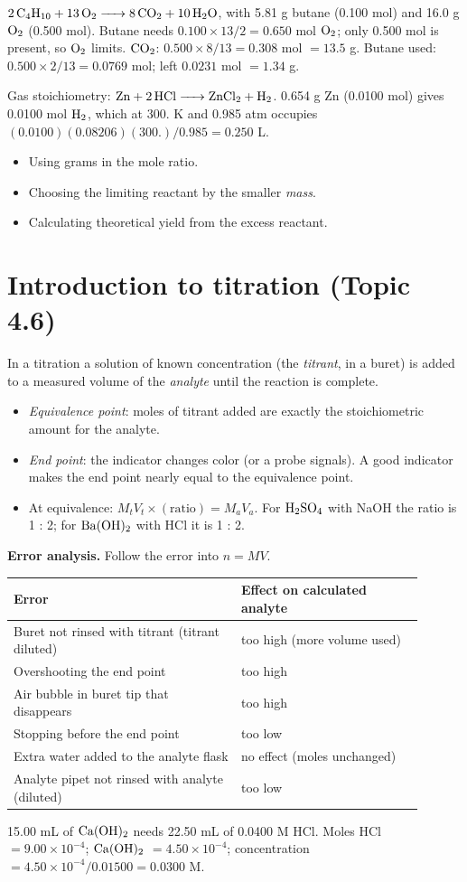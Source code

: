\documentclass[11pt]{article}
\begin{document}
 $\ce{2C4H10 + 13O2 -> 8CO2 + 10H2O}$, with 5.81 g butane (0.100 mol) and 16.0 g $\ce{O2}$ (0.500 mol). Butane needs $0.100 \times 13/2 = 0.650$ mol $\ce{O2}$; only 0.500 mol is present, so $\ce{O2}$ limits. $\ce{CO2}$: $0.500 \times 8/13 = 0.308$ mol $= 13.5$ g. Butane used: $0.500 \times 2/13 = 0.0769$ mol; left $0.0231$ mol $= 1.34$ g.

 Gas stoichiometry: $\ce{Zn + 2HCl -> ZnCl2 + H2}$. 0.654 g Zn (0.0100 mol) gives 0.0100 mol $\ce{H2}$, which at 300. K and 0.985 atm occupies $(0.0100)(0.08206)(300.)/0.985 = 0.250$ L.

\errorsh
\begin{itemize}
\item Using grams in the mole ratio.
\item Choosing the limiting reactant by the smaller \emph{mass}.
\item Calculating theoretical yield from the excess reactant.
\end{itemize}

\section{Introduction to titration (Topic 4.6)}\label{t:4.6}
In a titration a solution of known concentration (the \emph{titrant}, in a buret) is added to a measured volume of the \emph{analyte} until the reaction is complete.
\begin{itemize}
\item \emph{Equivalence point}: moles of titrant added are exactly the stoichiometric amount for the analyte.
\item \emph{End point}: the indicator changes color (or a probe signals). A good indicator makes the end point nearly equal to the equivalence point.
\item At equivalence: $M_tV_t \times (\text{ratio}) = M_aV_a$. For $\ce{H2SO4}$ with NaOH the ratio is 1 : 2; for $\ce{Ba(OH)2}$ with HCl it is 1 : 2.
\end{itemize}
\textbf{Error analysis.} Follow the error into $n = MV$.
\begin{center}
\begin{tabular}{p{0.5\linewidth}p{0.4\linewidth}}\toprule
Error & Effect on calculated analyte \\ \midrule
Buret not rinsed with titrant (titrant diluted) & too high (more volume used) \\
Overshooting the end point & too high \\
Air bubble in buret tip that disappears & too high \\
Stopping before the end point & too low \\
Extra water added to the analyte flask & no effect (moles unchanged) \\
Analyte pipet not rinsed with analyte (diluted) & too low \\ \bottomrule
\end{tabular}
\end{center}
 15.00 mL of $\ce{Ca(OH)2}$ needs 22.50 mL of 0.0400 M HCl. Moles HCl $= 9.00\times10^{-4}$; $\ce{Ca(OH)2}$ $= 4.50\times10^{-4}$; concentration $= 4.50\times10^{-4}/0.01500 = 0.0300$ M.
\end{document}
